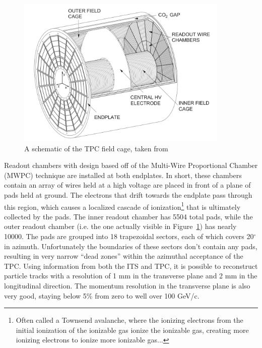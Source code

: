 \begin{figure}
    \centering
    \includegraphics[width=0.9\textwidth]{figures/experiment/tpc_schematic.png}
    \caption{A schematic of the TPC field cage, taken from~\cite{TPC1}}
    \label{fig:tpc_schematic}
\end{figure}

Readout chambers with design based off of the Multi-Wire Proportional Chamber (MWPC) technique are installed at both endplates. In short, these chambers contain an array of wires held at a high voltage are placed in front of a plane of pads held at ground. The electrons that drift towards the endplate pass through this region, which causes a localized cascade of ionization\footnote{Often called a Townsend avalanche, where the ionizing electrons from the initial ionization of the ionizable gas ionize the ionizable gas, creating more ionizing electrons to ionize more ionizable gas...} that is ultimately collected by the pads. The inner readout chamber has 5504 total pads, while the outer readout chamber (i.e. the one actually visible in Figure~\ref{fig:tpc_schematic}) has nearly 10000. The pads are grouped into 18 trapezoidal sectors, each of which covers 20$^\circ$ in azimuth. Unfortunately the boundaries of these sectors don't contain any pads, resulting in very narrow ``dead zones'' within the azimuthal acceptance of the TPC. Using information from both the ITS and TPC, it is possible to reconstruct particle tracks with a resolution of 1 mm in the transverse plane and 2 mm in the longitudinal direction. The momentum resolution in the transverse plane is also very good, staying below 5\% from zero to well over 100 GeV/c.

